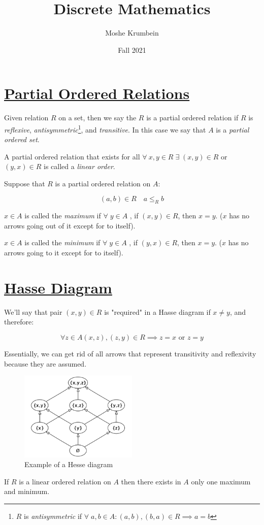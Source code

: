 \documentclass[00_complete]{subfiles}
\title{Discrete Mathematics}
\author{Moshe Krumbein}
\date{Fall 2021}
\begin{document}

\section{\href{https://en.wikipedia.org/wiki/Partially_ordered_set\#Partial_order_relation}{Partial Ordered Relations}}

Given relation \(R\) on a set, then we say the \(R\) is a partial
ordered relation if \(R\) is \emph{reflexive},
\emph{antisymmetric}\footnote{\(R\) is \emph{antisymmetric} if
  \(\forall \; a,b \in A: (a,b), (b,a) \in R \implies  a=b\)}, and
  \emph{transitive}. In this case we say that \(A\) is a \emph{partial
ordered set}.

\begin{definition}
A partial ordered relation that exists for all
\(\forall \: x,y \in R \;\exists\; (x,y) \in R\) or \((y,x) \in R\) is
called a \emph{linear order}.
\end{definition}

Suppose that \(R\) is a partial ordered relation on \(A\):

\[(a,b) \in R \quad a \leq_R b\]

\(x \in A\) is called the \emph{maximum} if \(\forall \; y \in A\) , if
\((x,y) \in R\), then \(x=y\). (\(x\) has no arrows going out of it
except for to itself).

\(x \in A\) is called the \emph{minimum} if \(\forall \; y \in A\) , if
\((y,x) \in R\), then \(x=y\). (\(x\) has no arrows going to it except
for to itself).

\section{\href{https://en.wikipedia.org/wiki/Hasse_diagram}{Hasse
Diagram}}

We'll say that pair \((x,y) \in R\) is "required" in a Hasse diagram
if \(x \neq y\), and therefore:

\[\forall z \in A (x,z),(z,y) \in R \implies z=x \text{ or } z=y\]

Essentially, we can get rid of all arrows that represent transitivity and
reflexivity because they are assumed.

\begin{figure}[ht]
    \centering
    \includegraphics[width=0.5\textwidth]{w4-hesse}
    \caption{Example of a Hesse diagram}
\end{figure}

\begin{claim}
If \(R\) is a linear ordered relation on \(A\) then there exists in
\(A\) only one maximum and minimum.
\end{claim}
\end{document}
